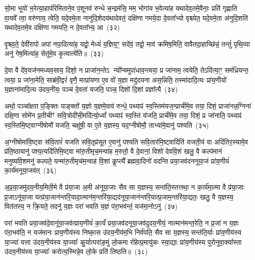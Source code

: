 सो॒मा भूयो॑ भ॒रेत्या॒हाप॑रिमिताने॒व प॒शूनव॑ रुन्धे च॒न्द्रम॑सि॒ मम॒ भोगा॑य भ॒वेत्या॑ह यथादेव॒तमे॒वैनाः॒ प्रति॑ गृह्णाति वा॒यवे᳚ त्वा॒ वरु॑णाय॒ त्वेति॒ यदे॒वमे॒ता नानु॑दि॒शेदय॑थादेवतं॒ दक्षि॑णा गमये॒दा दे॒वता᳚भ्यो वृश्च्येत॒ यदे॒वमे॒ता अ॑नुदि॒शति॑ यथादेव॒तमे॒व दक्षि॑णा गमयति॒ न दे॒वता᳚भ्य॒ आ~(३२)

वृ॒श्च्य॒ते॒ देवी॑रापो अपां नपा॒दित्या॑ह॒ यद्वो॒ मेध्यं॑ य॒ज्ञिय॒ꣳ॒ सदे॑वं॒ तद्वो॒ माव॑ क्रमिष॒मिति॒ वावैतदा॒हाच्छि॑न्नं॒ तन्तुं॑ पृथि॒व्या अनु॑ गेष॒मित्या॑ह॒ सेतु॑मे॒व कृ॒त्वात्ये॑ति॥~(३३)

{}%

दे॒वा वै दे॑व॒यज॑नमध्यव॒साय॒ दिशो॒ न प्राजा॑न॒न्ते\-ऽ न्यो᳚न्यमुपा॑धाव॒न्त्वया॒ प्र जा॑नाम॒ त्वयेति॒ ते\-ऽदि॑त्या॒ꣳ॒ सम॑ध्रियन्त॒ त्वया॒ प्र जा॑ना॒मेति॒ साब्र॑वी॒द्वरं॑ वृणै॒ मत्प्रा॑यणा ए॒व वो॑ य॒ज्ञा मदु॑दयना अस॒न्निति॒ तस्मा॑दादि॒त्यः प्रा॑य॒णीयो॑ य॒ज्ञाना॑मादि॒त्य उ॑दय॒नीयः॒ पञ्च॑ दे॒वता॑ यजति॒ पञ्च॒ दिशो॑ दि॒शां प्रज्ञा᳚त्यै~(३४)

अथो॒ पञ्चा᳚क्षरा प॒ङ्क्तिः पाङ्क्तो॑ य॒ज्ञो य॒ज्ञमे॒वाव॑ रुन्धे॒ पथ्याꣴ॑ स्व॒स्तिम॑यज॒न्प्राची॑मे॒व तया॒ दिशं॒ प्राजा॑नन्न॒ग्निना॑ दक्षि॒णा सोमे॑न प्र॒तीचीꣳ॑ सवि॒त्रोदी॑ची॒मदि॑त्यो॒र्ध्वां पथ्याꣴ॑ स्व॒स्तिं य॑जति॒ प्राची॑मे॒व तया॒ दिशं॒ प्र जा॑नाति॒ पथ्याꣴ॑ स्व॒स्तिमि॒ष्ट्वाग्नी\-षोमौ॑ यजति॒ चक्षु॑षी॒ वा ए॒ते य॒ज्ञस्य॒ यद॒ग्नी\-षोमौ॒ ताभ्या॑मे॒वानु॑ पश्यति~(३५)

अ॒ग्नी\-षोमा॑वि॒ष्ट्वा स॑वि॒तारं॑ यजति सवि॒तृप्र॑सूत ए॒वानु॑ पश्यति सवि॒तार॑मि॒ष्ट्वादि॑तिं यजती॒यं वा अदि॑तिर॒स्यामे॒व प्र॑ति॒ष्ठायानु॑ पश्य॒त्यदि॑तिमि॒ष्ट्वा मा॑रु॒तीमृच॒मन्वा॑ह म॒रुतो॒ वै दे॒वानां॒ विशो॑ देववि॒शं खलु॒ वै कल्प॑मानं मनुष्यवि॒श\-मनु॑ कल्पते॒ यन्मा॑रु॒तीमृच॑म॒न्वाह॑ वि॒शां कॢप्त्यै᳚ ब्रह्मवा॒दिनो॑ वदन्ति प्रया॒जव॑दननूया॒जं प्रा॑य॒णीयं॑ का॒र्य॑मनूया॒जव॑त्~(३६)

अ॒प्र॒या॒जमु॑दय॒नीय॒मिती॒मे वै प्र॑या॒जा अ॒मी अ॑नूया॒जाः सैव सा य॒ज्ञस्य॒ सन्त॑ति॒स्तत्तथा॒ न का॒र्य॑मा॒त्मा वै प्र॑या॒जाः प्र॒जा\-ऽनू॑या॒जा यत्प्र॑या॒जान॑न्तरि॒यादा॒त्मान॑म॒न्तरि॑या॒द्यद॑नूया॒जान॑न्तरि॒यात्प्र॒जाम॒न्तरि॑या॒द्यतः॒ खलु॒ वै य॒ज्ञस्य॒ वित॑तस्य॒ न क्रि॒यते॒ तदनु॑ य॒ज्ञः परा॑ भवति य॒ज्ञं प॑रा॒भव॑न्तं॒ यज॑मा॒नो\-ऽनु॑~(३७)

परा॑ भवति प्रया॒जव॑दे॒वानू॑या॒जव॑त्प्राय॒णीयं॑ का॒र्यं॑ प्रया॒जव॑दनूया॒जव॑दुदय॒नीयं॒ नात्मान॑मन्त॒रेति॒ न प्र॒जां न य॒ज्ञः प॑रा॒भव॑ति॒ न यज॑मानः प्राय॒णीय॑स्य निष्का॒स उ॑दय॒नीय॑म॒भि निर्व॑पति॒ सैव सा य॒ज्ञस्य॒ सन्त॑ति॒र्याः प्रा॑य॒णीय॑स्य या॒ज्या॑ यत्ता उ॑दय॒नीय॑स्य या॒ज्याः᳚ कु॒र्यात्परा॑ङ॒मुं लो॒कमा रो॑हेत्प्र॒मायु॑कः स्या॒द्याः प्रा॑य॒णीय॑स्य पुरोनुवा॒क्या᳚स्ता उ॑दय॒नीय॑स्य या॒ज्याः᳚ करोत्य॒स्मिन्ने॒व लो॒के प्रति॑ तिष्ठति॥~(३८)

